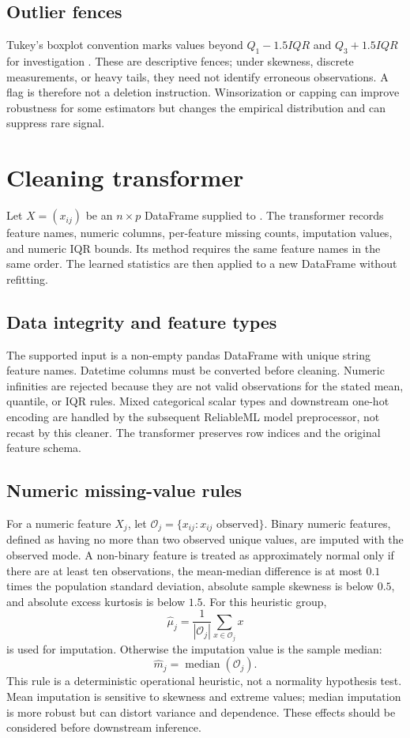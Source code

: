 \documentclass[conference]{IEEEtran}
\begin{document}
\subsection{Outlier fences}
Tukey's boxplot convention marks values beyond \(Q_1-1.5IQR\) and \(Q_3+1.5IQR\) for investigation \cite{tukey1977}. These are descriptive fences; under skewness, discrete measurements, or heavy tails, they need not identify erroneous observations. A flag is therefore not a deletion instruction. Winsorization or capping can improve robustness for some estimators but changes the empirical distribution and can suppress rare signal.

\section{Cleaning transformer}
Let \(X=(x_{ij})\) be an \(n\times p\) DataFrame supplied to . The transformer records feature names, numeric columns, per-feature missing counts, imputation values, and numeric IQR bounds. Its  method requires the same feature names in the same order. The learned statistics are then applied to a new DataFrame without refitting.

\subsection{Data integrity and feature types}
The supported input is a non-empty pandas DataFrame with unique string feature names. Datetime columns must be converted before cleaning. Numeric infinities are rejected because they are not valid observations for the stated mean, quantile, or IQR rules. Mixed categorical scalar types and downstream one-hot encoding are handled by the subsequent ReliableML model preprocessor, not recast by this cleaner. The transformer preserves row indices and the original feature schema.

\subsection{Numeric missing-value rules}
For a numeric feature \(X_j\), let \(\mathcal{O}_j=\{x_{ij}:x_{ij}\text{ observed}\}\). Binary numeric features, defined as having no more than two observed unique values, are imputed with the observed mode. A non-binary feature is treated as approximately normal only if there are at least ten observations, the mean-median difference is at most \(0.1\) times the population standard deviation, absolute sample skewness is below \(0.5\), and absolute excess kurtosis is below \(1.5\). For this heuristic group,
\[
\widehat\mu_j=\frac{1}{|\mathcal{O}_j|}
\sum_{x\in\mathcal{O}_j}x
\]
is used for imputation. Otherwise the imputation value is the sample median:
\[
\widehat m_j=\operatorname{median}(\mathcal{O}_j).
\]
This rule is a deterministic operational heuristic, not a normality hypothesis test. Mean imputation is sensitive to skewness and extreme values; median imputation is more robust but can distort variance and dependence. These effects should be considered before downstream inference.
\end{document}

